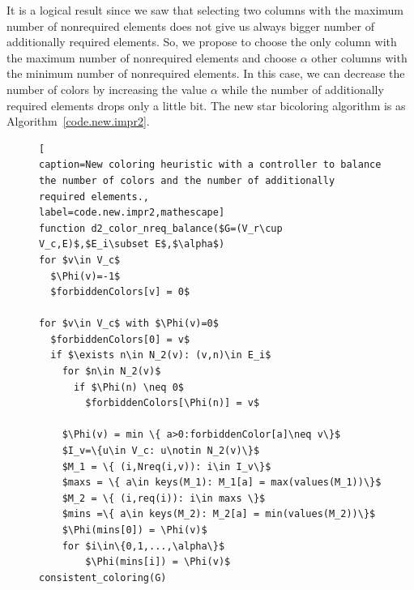 \documentclass[12pt, twoside,a4paper,toc=bibliography]{scrbook}
\newcommand{\coderef}[1]{Algorithm~\protect\ref{#1}}
\begin{document}
It is a logical result since we saw that selecting two columns with the maximum number of nonrequired
elements does not give us always bigger number of additionally required elements.
So, we propose to choose the only column with the maximum number of nonrequired elements and
choose $\alpha$ other columns with the minimum number of nonrequired elements. In this case,
we can decrease the number of colors by increasing the value $\alpha$ while the number of
additionally required elements drops only a little bit.
The new star bicoloring algorithm is as \coderef{code.new.impr2}.
\begin{figure}
\begin{lstlisting}[
caption=New coloring heuristic with a controller to balance
the number of colors and the number of additionally required elements.,
label=code.new.impr2,mathescape]
function d2_color_nreq_balance($G=(V_r\cup V_c,E)$,$E_i\subset E$,$\alpha$)
for $v\in V_c$
  $\Phi(v)=-1$
  $forbiddenColors[v] = 0$

for $v\in V_c$ with $\Phi(v)=0$
  $forbiddenColors[0] = v$
  if $\exists n\in N_2(v): (v,n)\in E_i$
    for $n\in N_2(v)$
      if $\Phi(n) \neq 0$
        $forbiddenColors[\Phi(n)] = v$

    $\Phi(v) = min \{ a>0:forbiddenColor[a]\neq v\}$
    $I_v=\{u\in V_c: u\notin N_2(v)\}$
    $M_1 = \{ (i,Nreq(i,v)): i\in I_v\}$
    $maxs = \{ a\in keys(M_1): M_1[a] = max(values(M_1))\}$
    $M_2 = \{ (i,req(i)): i\in maxs \}$
    $mins =\{ a\in keys(M_2): M_2[a] = min(values(M_2))\}$
    $\Phi(mins[0]) = \Phi(v)$
    for $i\in\{0,1,...,\alpha\}$
        $\Phi(mins[i]) = \Phi(v)$
consistent_coloring(G)
\end{lstlisting}
\end{figure}
\end{document}
